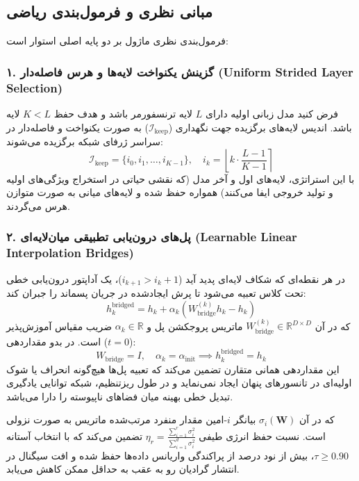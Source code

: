 \subsection{مبانی نظری و فرمول‌بندی ریاضی}
فرمول‌بندی نظری ماژول  بر دو پایه اصلی استوار است:

\subsubsection*{۱. گزینش یکنواخت لایه‌ها و هرس فاصله‌دار (Uniform Strided Layer Selection)}
فرض کنید مدل زبانی اولیه دارای $L$ لایه ترنسفورمر باشد و هدف حفظ $K < L$ لایه باشد. اندیس لایه‌های برگزیده جهت نگهداری ($\mathcal{I}_{\text{keep}}$) به صورت یکنواخت و فاصله‌دار در سراسر ژرفای شبکه برگزیده می‌شوند:
\begin{equation}
\mathcal{I}_{\text{keep}} = \{i_0, i_1, \dots, i_{K-1}\}, \quad i_k = \left\lfloor k \cdot \frac{L-1}{K-1} \right\rceil
\end{equation}
با این استراتژی، لایه‌های اول و آخر مدل (که نقشی حیاتی در استخراج ویژگی‌های اولیه و تولید خروجی ایفا می‌کنند) همواره حفظ شده و لایه‌های میانی به صورت متوازن هرس می‌گردند.

\subsubsection*{۲. پل‌های درون‌یابی تطبیقی میان‌لایه‌ای (Learnable Linear Interpolation Bridges)}
در هر نقطه‌ای که شکاف لایه‌ای پدید آید ($i_{k+1} > i_k + 1$)، یک آداپتور درون‌یابی خطی تحت کلاس  تعبیه می‌شود تا پرش ایجادشده در جریان پسماند را جبران کند:
\begin{equation}
h_k^{\text{bridged}} = h_k + \alpha_k \left( W_{\text{bridge}}^{(k)} h_k - h_k \right)
\end{equation}
که در آن $W_{\text{bridge}}^{(k)} \in \mathbb{R}^{D \times D}$ ماتریس پروجکشن پل و $\alpha_k \in \mathbb{R}$ ضریب مقیاس آموزش‌پذیر است. در بدو مقداردهی ($t=0$):
\begin{equation}
W_{\text{bridge}} = I, \quad \alpha_k = \alpha_{\text{init}} \implies h_k^{\text{bridged}} = h_k
\end{equation}
این مقداردهی همانی متقارن تضمین می‌کند که تعبیه پل‌ها هیچ‌گونه انحراف یا شوک اولیه‌ای در تانسورهای پنهان ایجاد نمی‌نماید و در طول ریزتنظیم، شبکه توانایی یادگیری تبدیل خطی بهینه میان فضاهای ناپیوسته را دارا می‌باشد.

که در آن $\sigma_i(\mathbf{W})$ بیانگر $i$-امین مقدار منفرد مرتب‌شده ماتریس به صورت نزولی است. نسبت حفظ انرژی طیفی $\eta_r = \frac{\sum_{i=1}^r \sigma_i^2}{\sum_{i=1}^{d} \sigma_i^2}$ تضمین می‌کند که با انتخاب آستانه $\tau \ge 0.90$، بیش از نود درصد از پراکندگی واریانس داده‌ها حفظ شده و افت سیگنال در انتشار گرادیان رو به عقب به حداقل ممکن کاهش می‌یابد.

